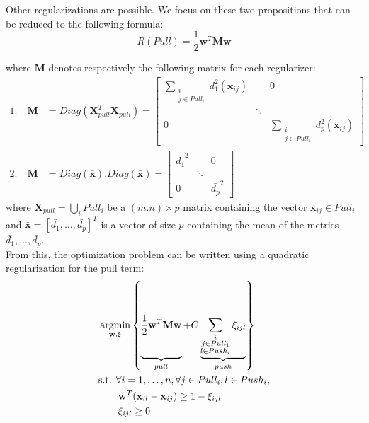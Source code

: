\noindent Other regularizations are possible. We focus on these two propositions that can be reduced to the following formula:
\begin{equation}
R(Pull) = \frac{1}{2} \textbf{w}^T \textbf{M} \textbf{w}
\end{equation}

\noindent where $\textbf{M}$ denotes respectively the following matrix for each regularizer:
\begin{align}
	1. \quad \textbf{M} &= Diag(\textbf{X}_{pull}^T\textbf{X}_{pull}) = 
	\begin{bmatrix} 
		\sum\limits_{\substack{i \\ j \in Pull_i}} d_1^2(\textbf{x}_{ij}) 		&  	& 0 \\ 
		& \ddots 	&  \\ 
		0 		&  	& \sum\limits_{\substack{i \\ j \in Pull_i}} d_p^2(\textbf{x}_{ij})
	\end{bmatrix} \label{eq:M_1} \\
	2. \quad \textbf{M} &= Diag(\bar{\textbf{x}}). Diag(\bar{\textbf{x}}) =
	\begin{bmatrix} 
		\bar{d_1}^2 &  	& 0 \\ 
		& \ddots 	&  \\ 
		0 		&  	& \bar{d_p}^2
	\end{bmatrix} \label{eq:M_2}
\end{align}
where $\textbf{X}_{pull} = \bigcup_i Pull_i $ be a $(m.n) \times p$ matrix containing the vector $\textbf{x}_{ij} \in Pull_i$ and $\bar{\textbf{x}}=[\bar{d_1}, \ldots, \bar{d_p}]^T$ is a vector of size $p$ containing the mean of the metrics $\bar{d_1}, \ldots, \bar{d_p}$.\\

\noindent From this, the optimization problem can be written using a quadratic regularization for the pull term:
\begin{equation}
	\begin{aligned}
	&\displaystyle 		\argmin_{\textbf{w},\xi}
	\left\lbrace \underbrace{
		\vphantom{ \sum\limits_{\substack{i \\ j \in Pull_i \\ l \in Push_i}} }
		\frac{1}{2} \textbf{w}^T \textbf{M} \textbf{w}		
	}_{pull}				
	+					
	C
	\underbrace{
	\sum\limits_{\substack{i \\ j \in Pull_i \\ l \in Push_i}}  \xi_{ijl}
	}_{push}
	\right\rbrace  \\
	&\text{s.t.  } \forall i = 1, \ldots, n, \forall j \in Pull_i, l \in Push_i, \\
	& \qquad \textbf{w}^T(\textbf{x}_{il}-\textbf{x}_{ij}) \geq 1-\xi_{ijl} \\
	& \qquad \xi_{ijl} \geq 0 
	\end{aligned}
	\label{eq:quadratic}
\end{equation}

